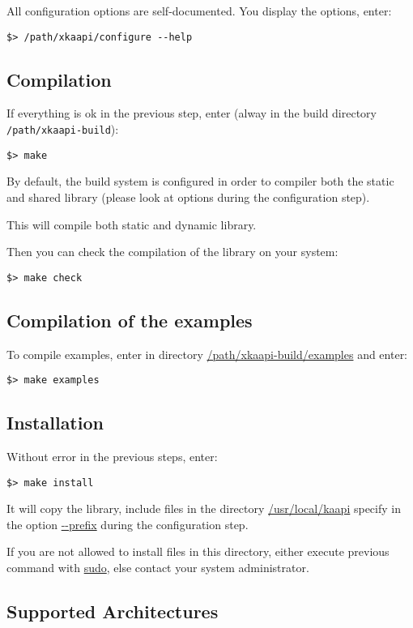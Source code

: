 \documentclass{article}
\begin{document}
All configuration options are self-documented. You display the options, enter:
\begin{verbatim}
$> /path/xkaapi/configure --help
\end{verbatim}


\subsection{Compilation}
If everything is ok in the previous step, enter (alway in the build directory \verb+/path/xkaapi-build+):
\begin{verbatim}
$> make
\end{verbatim}

By default, the build system is configured in order to compiler both the static and shared library (please look at options during the configuration step).

This will compile both static and dynamic library. 

Then you can check the compilation of the library on your system:
\begin{verbatim}
$> make check
\end{verbatim}

\subsection{Compilation of the examples}
To compile examples, enter in directory \url{/path/xkaapi-build/examples} and enter:
\begin{verbatim}
$> make examples
\end{verbatim}

\subsection{Installation}
Without error in the previous steps, enter:
\begin{verbatim}
$> make install
\end{verbatim}
It will copy the library, include files in the directory \url{/usr/local/kaapi} specify in the option \url{--prefix} during the
configuration step.

If you are not allowed to install files in this directory, either execute previous command with \url{sudo}, else
contact your system administrator.

\subsection{Supported Architectures}
\end{document}
